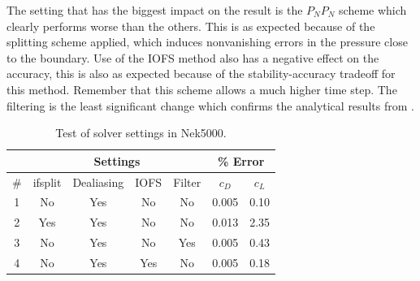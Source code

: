 The setting that has the biggest impact on the result is the $P_NP_N$ scheme which clearly performs 
worse than the others. This is as expected because of the splitting scheme applied, which 
induces nonvanishing errors in the pressure close to the boundary. 
Use of the IOFS method also has a negative effect on the accuracy,
this is also as expected because of the stability-accuracy tradeoff for this method.
Remember that this scheme allows a much higher time step. The filtering is the least significant change
which confirms the analytical results from . 
%
\begin{table}[h]
    \centering
    \begin{tabular}{c | c c c c | c c }
         & \multicolumn{4}{|c|}{Settings} & \multicolumn{2}{|c}{\% Error} \\\hline
         \#  & ifsplit & Dealiasing & IOFS & Filter & $c_D$ & $c_L$ \\  \hline 
         1 & No & Yes& No & No & 0.005 & 0.10\\
         2 & Yes& Yes& No & No & 0.013 & 2.35\\
         3 & No & Yes& No & Yes& 0.005 & 0.43\\
         4 & No & Yes& Yes& No & 0.005 & 0.18\\
    \end{tabular}
    \caption{Test of solver settings in Nek5000.}
    \label{tab:perf}
\end{table}
%

